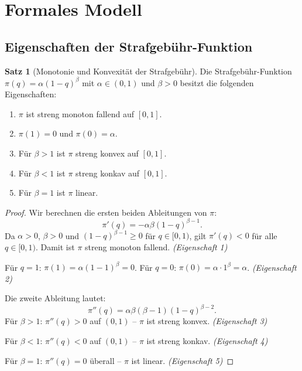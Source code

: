﻿\documentclass[a4paper,12pt]{article}
\theoremstyle{definition}
\newtheorem{satz}{Satz}
\begin{document}
\section{Formales Modell}
\label{sec:modell}

\subsection{Eigenschaften der Strafgebühr-Funktion}

\begin{satz}[Monotonie und Konvexität der Strafgebühr]
\label{satz:mono}
Die Strafgebühr-Funktion $\pi(q) = \alpha(1-q)^{\beta}$ mit $\alpha \in (0,1)$
und $\beta > 0$ besitzt die folgenden Eigenschaften:
\begin{enumerate}
  \item $\pi$ ist streng monoton fallend auf $[0,1]$.
  \item $\pi(1) = 0$ und $\pi(0) = \alpha$.
  \item Für $\beta > 1$ ist $\pi$ streng konvex auf $[0,1]$.
  \item Für $\beta < 1$ ist $\pi$ streng konkav auf $[0,1]$.
  \item Für $\beta = 1$ ist $\pi$ linear.
\end{enumerate}
\end{satz}

\begin{proof}
Wir berechnen die ersten beiden Ableitungen von $\pi$:
\[
\pi'(q) = -\alpha \beta (1-q)^{\beta-1}.
\]
Da $\alpha > 0$, $\beta > 0$ und $(1-q)^{\beta-1} \geq 0$ für $q \in [0,1)$,
gilt $\pi'(q) < 0$ für alle $q \in [0,1)$.  Damit ist $\pi$ streng monoton fallend.
\emph{(Eigenschaft 1)}

Für $q = 1$: $\pi(1) = \alpha(1-1)^{\beta} = 0$.
Für $q = 0$: $\pi(0) = \alpha \cdot 1^{\beta} = \alpha$.
\emph{(Eigenschaft 2)}

Die zweite Ableitung lautet:
\[
\pi''(q) = \alpha \beta (\beta - 1)(1-q)^{\beta-2}.
\]
Für $\beta > 1$: $\pi''(q) > 0$ auf $(0,1)$ -- $\pi$ ist streng konvex.
\emph{(Eigenschaft 3)}

Für $\beta < 1$: $\pi''(q) < 0$ auf $(0,1)$ -- $\pi$ ist streng konkav.
\emph{(Eigenschaft 4)}

Für $\beta = 1$: $\pi''(q) = 0$ überall -- $\pi$ ist linear.
\emph{(Eigenschaft 5)}
\end{proof}
\end{document}
